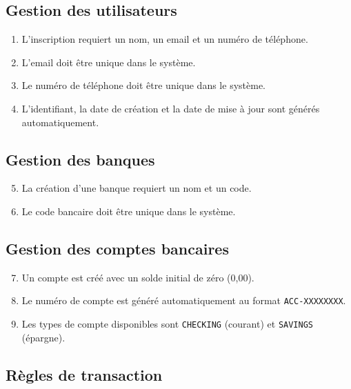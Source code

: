 \documentclass[12pt,a4paper]{article}
\begin{document}
\subsection{Gestion des utilisateurs}

\begin{enumerate}[label=\textbf{RG-\arabic*}.]
    \item L'inscription requiert un nom, un email et un numéro de téléphone.
    \item L'email doit être unique dans le système.
    \item Le numéro de téléphone doit être unique dans le système.
    \item L'identifiant, la date de création et la date de mise à jour sont générés automatiquement.
\end{enumerate}

\subsection{Gestion des banques}

\begin{enumerate}[label=\textbf{RG-\arabic*}.]
    \setcounter{enumi}{4}
    \item La création d'une banque requiert un nom et un code.
    \item Le code bancaire doit être unique dans le système.
\end{enumerate}

\subsection{Gestion des comptes bancaires}

\begin{enumerate}[label=\textbf{RG-\arabic*}.]
    \setcounter{enumi}{6}
    \item Un compte est créé avec un solde initial de zéro (0,00).
    \item Le numéro de compte est généré automatiquement au format \texttt{ACC-XXXXXXXX}.
    \item Les types de compte disponibles sont \texttt{CHECKING} (courant) et \texttt{SAVINGS} (épargne).
\end{enumerate}

\subsection{Règles de transaction}
\end{document}
